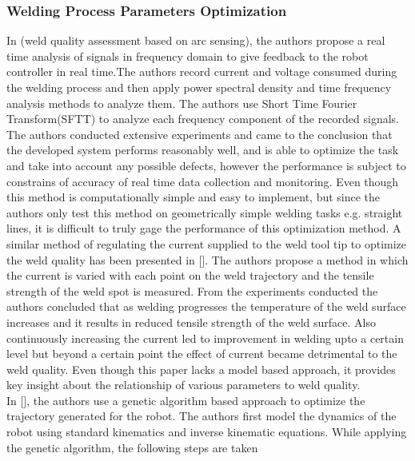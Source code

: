 \subsubsection{Welding Process Parameters Optimization}
In \citet{Lubecki2015}(weld quality assessment based on arc sensing), the authors propose a real time analysis of signals in frequency domain to give feedback to the robot controller in real time.The authors record current and voltage consumed during the welding process and then apply power spectral density and time frequency analysis methods to analyze them. The authors use Short Time Fourier Transform(SFTT) to analyze each frequency component of the recorded signals. The authors conducted extensive experiments and came to the conclusion that the developed system performs reasonably well, and is able to optimize the task and take into account any possible defects, however the performance is subject to constrains of accuracy of real time data collection and monitoring. Even though this method is computationally simple and easy to implement, but since the authors only test this method on geometrically simple welding tasks e.g. straight lines, it is difficult to truly gage the performance of this optimization method. A similar method of regulating the current supplied to the weld tool tip to optimize the weld quality has been presented in [\citet{Liang2011}]. The authors propose a method in which the current is varied with each point on the weld trajectory and the tensile strength of the weld spot is measured. From the experiments conducted the authors concluded that as welding progresses the temperature of the weld surface increases and it results in reduced tensile strength of the weld surface. Also continuously increasing the current led to improvement in welding upto a certain level but beyond a certain point the effect of current became detrimental to the weld quality. Even though this paper lacks a model based approach, it provides key insight about the relationship of various parameters to weld quality.\\
In [\citet{XiaopingLiao2010}], the authors use a genetic algorithm based approach to optimize the trajectory generated for the robot. The authors first model the dynamics of the robot using standard kinematics and inverse kinematic equations. While applying the genetic algorithm, the following steps are taken
